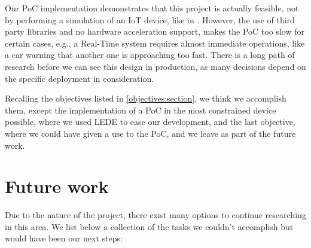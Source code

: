 Our PoC implementation demonstrates that this project is actually feasible, not by performing a simulation of an IoT device, like in \citep{vanet}. However, the use of third party libraries and no hardware acceleration support, makes the PoC too slow for certain cases, e.g., a Real-Time system requires almost immediate operations, like a car warning that another one is approaching too fast.
There is a long path of research before we can see this design in production, as many decisions depend on the specific deployment in consideration.


Recalling the objectives listed in \autoref{objectives:section}, we think we accomplish them, except the implementation of a PoC in the most constrained device possible, where we used LEDE to ease our development, and the last objective, where we could have given a use to the PoC, and we leave as part of the future work.



\section{Future work}


Due to the nature of the project, there exist many options to continue researching in this area. We list below a collection of the tasks we couldn't accomplish but would have been our next steps:


